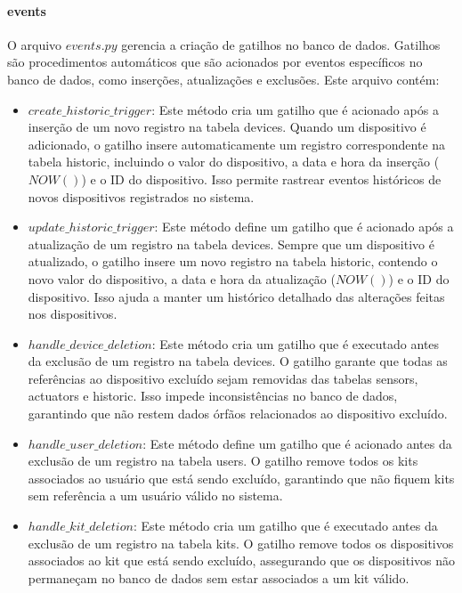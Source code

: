 \documentclass[conference, a4paper, 12pt]{IEEEtran}
\begin{document}
\paragraph{events}
O arquivo $events.py$ gerencia a criação de gatilhos no banco de dados. Gatilhos são procedimentos automáticos que são acionados por eventos específicos no banco de dados, como inserções, atualizações e exclusões. Este arquivo contém:
\begin{itemize}
    \item $create\_historic\_trigger$: Este método cria um gatilho que é acionado após a inserção de um novo registro na tabela devices. Quando um dispositivo é adicionado, o gatilho insere automaticamente um registro correspondente na tabela historic, incluindo o valor do dispositivo, a data e hora da inserção ($NOW()$) e o ID do dispositivo. Isso permite rastrear eventos históricos de novos dispositivos registrados no sistema.
    \item $update\_historic\_trigger$: Este método define um gatilho que é acionado após a atualização de um registro na tabela devices. Sempre que um dispositivo é atualizado, o gatilho insere um novo registro na tabela historic, contendo o novo valor do dispositivo, a data e hora da atualização ($NOW()$) e o ID do dispositivo. Isso ajuda a manter um histórico detalhado das alterações feitas nos dispositivos.
    \item $handle\_device\_deletion$: Este método cria um gatilho que é executado antes da exclusão de um registro na tabela devices. O gatilho garante que todas as referências ao dispositivo excluído sejam removidas das tabelas sensors, actuators e historic. Isso impede inconsistências no banco de dados, garantindo que não restem dados órfãos relacionados ao dispositivo excluído.
    \item $handle\_user\_deletion$: Este método define um gatilho que é acionado antes da exclusão de um registro na tabela users. O gatilho remove todos os kits associados ao usuário que está sendo excluído, garantindo que não fiquem kits sem referência a um usuário válido no sistema.
    \item $handle\_kit\_deletion$: Este método cria um gatilho que é executado antes da exclusão de um registro na tabela kits. O gatilho remove todos os dispositivos associados ao kit que está sendo excluído, assegurando que os dispositivos não permaneçam no banco de dados sem estar associados a um kit válido.
\end{itemize}
\end{document}
